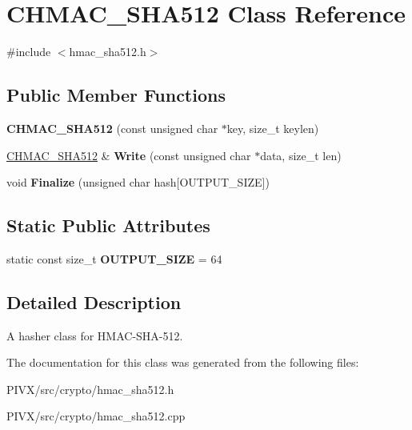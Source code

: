\hypertarget{class_c_h_m_a_c___s_h_a512}{}\section{C\+H\+M\+A\+C\+\_\+\+S\+H\+A512 Class Reference}
\label{class_c_h_m_a_c___s_h_a512}


{\ttfamily \#include $<$hmac\+\_\+sha512.\+h$>$}

\subsection*{Public Member Functions}
\begin{DoxyCompactItemize}
\item 
\mbox{\label{class_c_h_m_a_c___s_h_a512_a03e1288c20422f66b7e732aafda804e5}} 
{\bfseries C\+H\+M\+A\+C\+\_\+\+S\+H\+A512} (const unsigned char $\ast$key, size\+\_\+t keylen)
\item 
\mbox{\label{class_c_h_m_a_c___s_h_a512_aefdf2b068b668027b67c8822227a5a18}} 
\mbox{\hyperlink{class_c_h_m_a_c___s_h_a512}{C\+H\+M\+A\+C\+\_\+\+S\+H\+A512}} \& {\bfseries Write} (const unsigned char $\ast$data, size\+\_\+t len)
\item 
\mbox{\label{class_c_h_m_a_c___s_h_a512_a3042ed5129bd381eb18ed2da201d6ed5}} 
void {\bfseries Finalize} (unsigned char hash\mbox{[}O\+U\+T\+P\+U\+T\+\_\+\+S\+I\+ZE\mbox{]})
\end{DoxyCompactItemize}
\subsection*{Static Public Attributes}
\begin{DoxyCompactItemize}
\item 
\mbox{\label{class_c_h_m_a_c___s_h_a512_a3baae67a0cf9702e18fff8f4f7ae05b6}} 
static const size\+\_\+t {\bfseries O\+U\+T\+P\+U\+T\+\_\+\+S\+I\+ZE} = 64
\end{DoxyCompactItemize}


\subsection{Detailed Description}
A hasher class for H\+M\+A\+C-\/\+S\+H\+A-\/512. 

The documentation for this class was generated from the following files\+:\begin{DoxyCompactItemize}
\item 
P\+I\+V\+X/src/crypto/hmac\+\_\+sha512.\+h\item 
P\+I\+V\+X/src/crypto/hmac\+\_\+sha512.\+cpp\end{DoxyCompactItemize}
